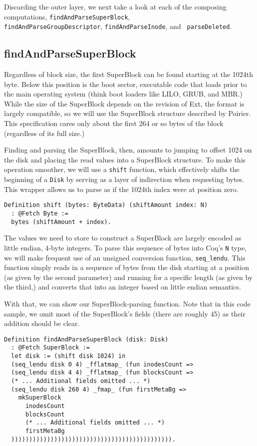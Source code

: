 \documentclass[nocopyrightspace,preprint]{sigplanconf}
\begin{document}
Discarding the outer layer, we next take a look at each of the composing
computations, {\tt findAndParseSuperBlock}, \\
{\tt findAndParseGroupDescriptor}, {\tt findAndParseInode}, and {\tt
parseDeleted}.

\subsection{findAndParseSuperBlock}

Regardless of block size, the first SuperBlock can be found starting at the
1024th byte. Below this position is the boot sector, executable code that
loads prior to the main operating system (think boot loaders like LILO, GRUB,
and MBR.) While the size of the SuperBlock depends on the revision of Ext, the
format is largely compatible, so we will use the SuperBlock structure
described by Poirier. This specification cares only about the first 264 or so
bytes of the block (regardless of its full size.)

Finding and parsing the SuperBlock, then, amounts to jumping to offset 1024 on
the disk and placing the read values into a SuperBlock structure. To make this
operation smoother, we will use a {\tt shift} function, which effectively
shifts the beginning of a {\tt Disk} by serving as a layer of indirection when
requesting bytes. This wrapper allows us to parse as if the 1024th index were
at position zero.

\begin{lstlisting}
Definition shift (bytes: ByteData) (shiftAmount index: N)
  : @Fetch Byte :=
  bytes (shiftAmount + index).
\end{lstlisting}

The values we need to store to construct a SuperBlock are largely encoded as
little endian, 4-byte integers. To parse this sequence of bytes into Coq's
{\tt N} type, we will make frequent use of an unsigned conversion function,
{\tt seq\_lendu}. This function simply reads in a sequence of bytes from the
disk starting at a position (as given by the second parameter) and running for
a specific length (as given by the third,) and converts that into an integer
based on little endian semantics. 

With that, we can show our SuperBlock-parsing function. Note that in this code
sample, we omit most of the SuperBlock's fields (there are roughly 45) as
their addition should be clear.

\begin{lstlisting}
Definition findAndParseSuperBlock (disk: Disk)
  : @Fetch SuperBlock :=
  let disk := (shift disk 1024) in
  (seq_lendu disk 0 4) _fflatmap_ (fun inodesCount =>
  (seq_lendu disk 4 4) _fflatmap_ (fun blocksCount =>
  (* ... Additional fields omitted ... *)
  (seq_lendu disk 260 4) _fmap_ (fun firstMetaBg =>
    mkSuperBlock
      inodesCount
      blocksCount
      (* ... Additional fields omitted ... *)
      firstMetaBg
  ))))))))))))))))))))))))))))))))))))))))))))).
\end{lstlisting}
\end{document}
